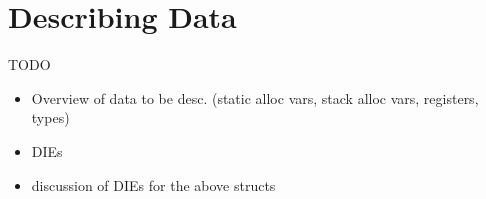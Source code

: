 
\section{Describing Data}


\begin{frame}{TODO}
\begin{itemize}
\item Overview of data to be desc. (static alloc vars, stack alloc vars, registers, types)
\item DIEs
\item discussion of DIEs for the above structs
\end{itemize}
\end{frame}
